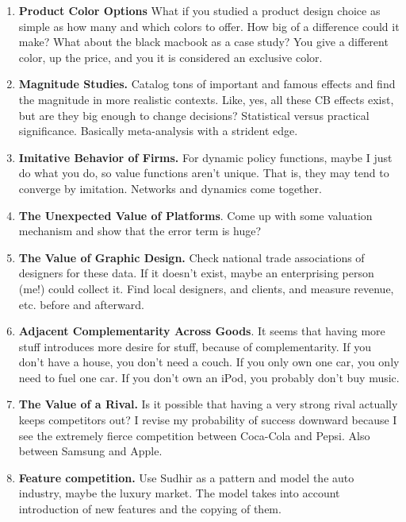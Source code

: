 \documentclass[paper=a4, fontsize=11pt]{scrartcl} %
\numberwithin{equation}{section} %
\numberwithin{figure}{section} %
\numberwithin{table}{section} %
\begin{document}
\begin{enumerate}

\item \textbf{Product Color Options} What if you studied a product design choice as simple as how many and which colors to offer.  How big of a difference could it make?  What about the black macbook as a case study?  You give a different color, up the price, and you it is considered an exclusive color.  

\item \textbf{Magnitude Studies.}  Catalog tons of important and famous effects and find the magnitude in more realistic contexts.  Like, yes, all these CB effects exist, but are they big enough to change decisions?  Statistical versus practical significance.   Basically meta-analysis with a strident edge.

\item \textbf{Imitative Behavior of Firms.}  For dynamic policy functions, maybe I just do what you do, so value functions aren't unique.  That is, they may tend to converge by imitation.  Networks and dynamics come together.  

\item \textbf{The Unexpected Value of Platforms}.  Come up with some valuation mechanism and show that the error term is huge?

\item \textbf{The Value of Graphic Design.}  Check national trade associations of designers for these data.  If it doesn't exist, maybe an enterprising person (me!) could collect it.  Find local designers, and clients, and measure revenue, etc. before and afterward.  

\item \textbf{Adjacent Complementarity Across Goods}.  It seems that having more stuff introduces more desire for stuff, because of complementarity.  If you don't have a house, you don't need a couch.  If you only own one car, you only need to fuel one car.  If you don't own an iPod, you probably don't buy music.  

\item \textbf{The Value of a Rival.}  Is it possible that having a very strong rival actually keeps competitors out?  I revise my probability of success downward because I see the extremely fierce competition between Coca-Cola and Pepsi.  Also between Samsung and Apple.  

\item \textbf{Feature competition.}  Use Sudhir as a pattern and model the auto industry, maybe the luxury market.  The model takes into account introduction of new features and the copying of them. 


\end{enumerate}
\end{document}
